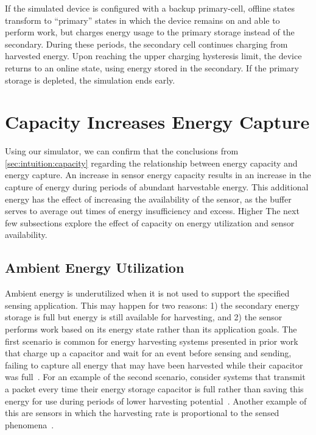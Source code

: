 If the simulated device is configured with a backup primary-cell, offline
states transform to ``primary'' states in which the device remains on and
able to perform work, but charges energy usage to the primary storage instead
of the secondary. During these periods, the secondary cell continues charging
from harvested energy. Upon reaching the upper charging hysteresis
limit, the device returns to an online state, using energy stored in the
secondary.  If the primary storage is depleted, the simulation ends early.


\section{Capacity Increases Energy Capture}
\label{sec:capacity:capture}

Using our simulator, we can confirm that the conclusions 
from \cref{sec:intuition:capacity}
regarding the relationship between energy capacity and energy capture. 
An increase in sensor energy capacity results in an increase in the capture of energy during periods of abundant harvestable energy.
This additional energy has the effect of increasing the availability of the sensor, as the buffer serves to average out times of energy insufficiency and excess.
Higher
The next few subsections explore the effect of capacity on energy utilization and sensor availability.

\subsection{Ambient Energy Utilization}
\label{sec:capacity:utilization}

Ambient energy is underutilized when it is not used to support the specified
sensing application. This may happen for two reasons: 1) 
the secondary
energy storage is full but energy is still available for harvesting, and 2) the
sensor performs work based on its energy state rather than its application
goals. The first scenario is common for energy harvesting systems
presented in prior work that charge up a capacitor and wait for an event
before sensing and sending, failing to capture all energy that may
have been harvested while their capacitor was full~\cite{campbellEnergy14, afanasov2020battery}.
For an example of the second scenario, consider
systems that transmit a packet every time their energy storage capacitor
is full rather than saving this energy for use during periods of lower harvesting
potential~\cite{hesterFlicker17, colinReconfigurable18}. Another example of this are sensors in which the harvesting
rate is proportional to the sensed phenomena~\cite{debruin2013monjolo}.

